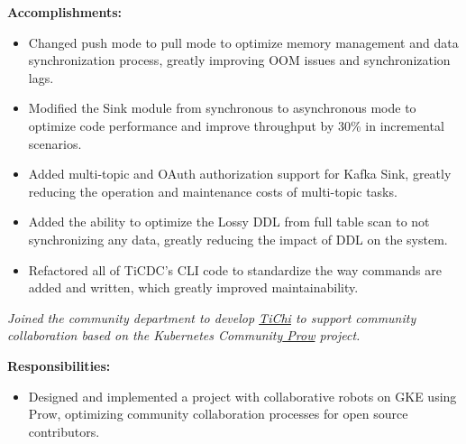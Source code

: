 \documentclass{software_engineer_rustin_liu}
\newcommand{\en}[1]{#1}
\newcommand{\zh}[1]{}
\begin{document}
\en{\textbf{Accomplishments:}}
\zh{\textbf{产出：}}
\begin{itemize}
      \item \en{Changed push mode to pull mode to optimize memory management and data synchronization process, greatly improving OOM issues and synchronization lags.}
            \zh{将推送模式修改为了拉取模式优化了内存管理和数据同步流程，极大的改善了 OOM 问题和同步延迟。}
      \item \en{Modified the Sink module from synchronous to asynchronous mode to optimize code performance and improve throughput by 30\% in incremental scenarios.}
            \zh{将 Sink 模块从同步模式修改为异步模式，优化代码性能，将增量场景下吞吐提升 30\%。}
      \item \en{ Added multi-topic and OAuth authorization support for Kafka Sink, greatly reducing the operation and maintenance costs of multi-topic tasks.}
            \zh{为 Kafka Sink 支持了多 Topic 和 OAuth 授权功能，极大的降低了多 Topic 的任务运维成本。}
      \item \en{Added the ability to optimize the Lossy DDL from full table scan to not synchronizing any data, greatly reducing the impact of DDL on the system.}
            \zh{将有损 DDL 从全表扫描优化为不同步任何数据，极大的降低了有损 DDL 对系统的影响。}
      \item \en{Refactored all of TiCDC’s CLI code to standardize the way commands are added and written, which greatly improved maintainability.}
            \zh{重构了 TiCDC 的 CLI 所有代码，标准化了命令添加和编写方式，极大提升了可维护性。}
\end{itemize}

\en{}
\zh{\datedsubsection{\textbf{\href{https://pingcap.com/zh/}{PingCAP Inc. - 数据库 - 前后端开发工程师（Golang/JS）}}}{2020/08 -- 2021/07}}
\en{\textsl{Joined the community department to develop {\href{https://github.com/ti-community-infra/tichi}{TiChi}} to support community collaboration based on the Kubernetes Community{\href{https://github.com/kubernetes/test-infra/tree/master/prow}{ Prow}} project.}}
\zh{\textsl{加入了社区部门，以 Kubernetes 社区{\href{https://github.com/kubernetes/test-infra/tree/master/prow}{ Prow}} 项目为基础开发{\href{https://github.com/ti-community-infra/tichi}{ TiChi}} 来支撑社区协作。}}

\en{\textbf{Responsibilities:}}
\zh{\textbf{职责：}}
\begin{itemize}
      \item \en{Designed and implemented a project with collaborative robots on GKE using Prow, optimizing community collaboration processes for open source contributors.}
            \zh{使用 Prow 在 GKE 上设计和实现一个协作机器人项目，优化开源贡献者的社区协作流程。}
\end{itemize}
\end{document}
